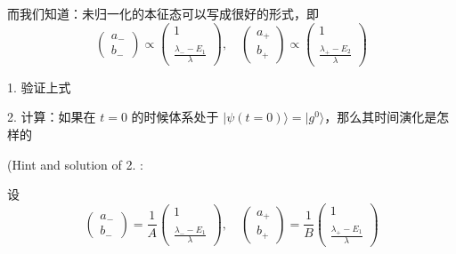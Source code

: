 而我们知道：未归一化的本征态可以写成很好的形式，即
\begin{equation}
\left(\begin{matrix}a_-\\b_-\end{matrix}\right) \propto \left(\begin{matrix}1 \\ \ \\ \displaystyle\frac{\lambda_- - E_1}{\lambda}\end{matrix}\right),\quad \left(\begin{matrix}a_+\\b_+\end{matrix}\right) \propto \left(\begin{matrix}1 \\ \ \\ \displaystyle\frac{\lambda_+ - E_2}{\lambda}\end{matrix}\right)
\end{equation}

1. 验证上式

2. 计算：如果在 $t=0$ 的时候体系处于 $|\psi(t=0)\rangle = |g^0\rangle$，那么其时间演化是怎样的

(Hint and solution of 2. :

设
\begin{equation}
\left(\begin{matrix}a_-\\b_-\end{matrix}\right) =\frac{1}{A} \left(\begin{matrix}1 \\ \ \\ \displaystyle\frac{\lambda_- - E_1}{\lambda}\end{matrix}\right),\quad \left(\begin{matrix}a_+\\b_+\end{matrix}\right) =\frac{1}{B} \left(\begin{matrix}1 \\ \ \\ \displaystyle\frac{\lambda_+ - E_1}{\lambda}\end{matrix}\right) 
\end{equation}

